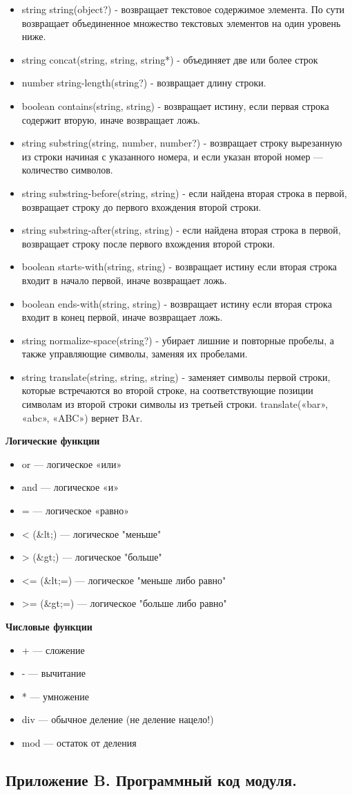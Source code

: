 \documentclass[12pt,a4paper,oneside]{article} %
\begin{document}
\begin{itemize}
\item string string(object?) - возвращает текстовое содержимое элемента. По сути возвращает объединенное множество текстовых элементов на один уровень ниже.
\item string concat(string, string, string*) - объединяет две или более строк
\item number string-length(string?) - возвращает длину строки.
\item boolean contains(string, string) - возвращает истину, если первая строка содержит вторую, иначе возвращает ложь.
\item string substring(string, number, number?) - возвращает строку вырезанную из строки начиная с указанного номера, и если указан второй номер — количество символов.
\item string substring-before(string, string) - если найдена вторая строка в первой, возвращает строку до первого вхождения второй строки.
\item string substring-after(string, string) - если найдена вторая строка в первой, возвращает строку после первого вхождения второй строки.
\item boolean starts-with(string, string) - возвращает истину если вторая строка входит в начало первой, иначе возвращает ложь.
\item boolean ends-with(string, string) - возвращает истину если вторая строка входит в конец первой, иначе возвращает ложь.
\item string normalize-space(string?) - убирает лишние и повторные пробелы, а также управляющие символы, заменяя их пробелами.
\item string translate(string, string, string) - заменяет символы первой строки, которые встречаются во второй строке, на соответствующие позиции символам из второй строки символы из третьей строки. translate(«bar», «abc», «ABC») вернет BAr.
\end{itemize}

\textbf{Логические функции}

\begin{itemize}
\item or — логическое «или»
\item and — логическое «и»
\item = — логическое «равно»
\item < (\&lt;) — логическое "меньше"
\item > (\&gt;) — логическое "больше"
\item <= (\&lt;=) — логическое "меньше либо равно"
\item >= (\&gt;=) — логическое "больше либо равно"
\end{itemize}

\textbf{Числовые функции}

\begin{itemize}
\item + — сложение
\item - — вычитание
\item * — умножение
\item div — обычное деление (не деление нацело!)
\item mod — остаток от деления
\end{itemize}
\newpage
\subsection{Приложение B. Программный код модуля.}

\end{document}
